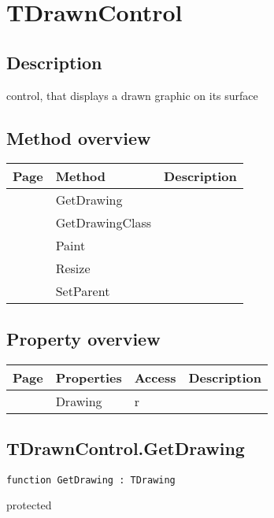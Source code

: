 \section{TDrawnControl}
\label{hmi:drawncontrol:tdrawncontrol}
\subsection{Description}
control, that displays a drawn graphic on its surface%
\subsection{Method overview}
\label{hmi:drawncontrol:tdrawncontrol:methods}
\begin{tabularx}{\textwidth}{llX}
Page & Method & Description  \\ \hline
\pageref{hmi:drawncontrol:tdrawncontrol:getdrawing} & GetDrawing  &  \\
\pageref{hmi:drawncontrol:tdrawncontrol:getdrawingclass} & GetDrawingClass  &  \\
\pageref{hmi:drawncontrol:tdrawncontrol:paint} & Paint  &  \\
\pageref{hmi:drawncontrol:tdrawncontrol:resize} & Resize  &  \\
\pageref{hmi:drawncontrol:tdrawncontrol:setparent} & SetParent  &  \\
\hline
\end{tabularx}
\subsection{Property overview}
\label{hmi:drawncontrol:tdrawncontrol:properties}
\begin{tabularx}{\textwidth}{lllX}
Page & Properties & Access & Description \\ \hline
\pageref{hmi:drawncontrol:tdrawncontrol:drawing} & Drawing & r &  \\
\hline
\end{tabularx}
\subsection{TDrawnControl.GetDrawing}
\label{hmi:drawncontrol:tdrawncontrol:getdrawing}
\begin{FPCList}
\Declaration 

\begin{verbatim}
function GetDrawing : TDrawing
\end{verbatim}
\Visibility
protected
\end{FPCList}
